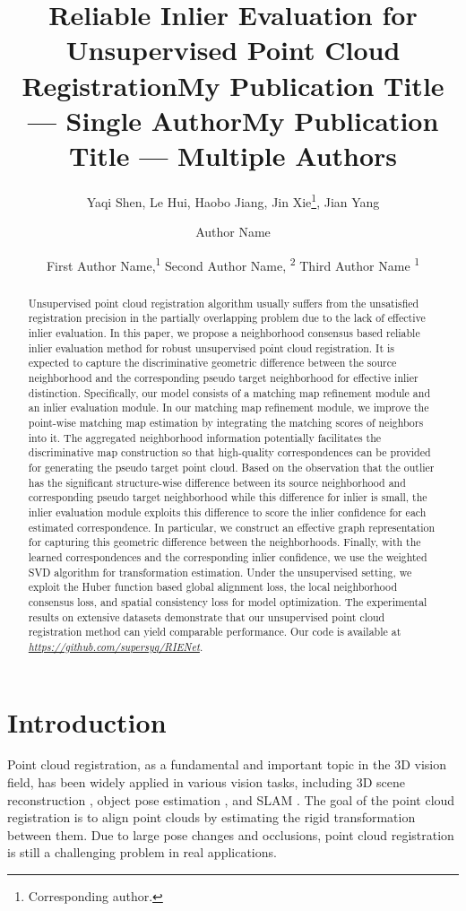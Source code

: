 \documentclass[letterpaper]{article} %
\title{Reliable Inlier Evaluation for Unsupervised Point Cloud Registration}
\author{
	Yaqi Shen,
	Le Hui,
	Haobo Jiang,
	Jin Xie\thanks{Corresponding author.},
	Jian Yang
}
\title{My Publication Title --- Single Author}
\author {
    Author Name
}
\title{My Publication Title --- Multiple Authors}
\author {
    First Author Name,\textsuperscript{\rm 1}
    Second Author Name, \textsuperscript{\rm 2}
    Third Author Name \textsuperscript{\rm 1}
}
\begin{document}
	\maketitle

	\begin{abstract}
	Unsupervised point cloud registration algorithm usually suffers from the unsatisfied registration precision in the partially overlapping problem due to the lack of effective inlier evaluation. In this paper, we propose a neighborhood consensus based reliable inlier evaluation method for robust unsupervised point cloud registration. It is expected to capture the discriminative geometric difference between the source neighborhood and the corresponding pseudo target neighborhood for effective inlier distinction. Specifically, our model consists of a matching map refinement module and an inlier evaluation module. In our matching map refinement module, we improve the point-wise matching map estimation by integrating the matching scores of neighbors into it. The aggregated neighborhood information potentially facilitates the discriminative map construction so that high-quality correspondences can be provided for generating the pseudo target point cloud. Based on the observation that the outlier has the significant structure-wise difference between its source neighborhood and corresponding pseudo target neighborhood while this difference for inlier is small, the inlier evaluation module exploits this difference to score the inlier confidence for each estimated correspondence. In particular, we construct an effective graph representation for capturing this geometric difference between the neighborhoods. Finally, with the learned correspondences and the corresponding inlier confidence, we use the weighted SVD algorithm for transformation estimation. Under the unsupervised setting, we exploit the Huber function based global alignment loss, the local neighborhood consensus loss, and spatial consistency loss for model optimization. The experimental results on extensive datasets demonstrate that our unsupervised point cloud registration method can yield comparable performance. Our code is available at \emph{\url{https://github.com/supersyq/RIENet}}.
	\end{abstract}

	\section{Introduction}
	Point cloud registration, as a fundamental and important topic in the 3D vision field, has been widely applied in various vision tasks, including 3D scene reconstruction \cite{agarwal2011building,schonberger2016structure}, object pose estimation \cite{wong2017segicp}, and SLAM \cite{deschaud2018imls,zhang2014loam}.
	The goal of the point cloud registration is to align point clouds by estimating the rigid transformation between them.
	Due to large pose changes and occlusions, point cloud registration is still a challenging problem in real applications.
\end{document}

